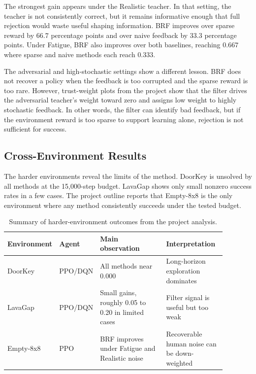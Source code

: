 \documentclass[11pt]{article}
\begin{document}
The strongest gain appears under the Realistic teacher. In that setting, the teacher is not consistently correct, but it remains informative enough that full rejection would waste useful shaping information. BRF improves over sparse reward by $66.7$ percentage points and over naive feedback by $33.3$ percentage points. Under Fatigue, BRF also improves over both baselines, reaching $0.667$ where sparse and naive methods each reach $0.333$.

The adversarial and high-stochastic settings show a different lesson. BRF does not recover a policy when the feedback is too corrupted and the sparse reward is too rare. However, trust-weight plots from the project show that the filter drives the adversarial teacher's weight toward zero and assigns low weight to highly stochastic feedback. In other words, the filter can identify bad feedback, but if the environment reward is too sparse to support learning alone, rejection is not sufficient for success.

\subsection{Cross-Environment Results}

The harder environments reveal the limits of the method. DoorKey is unsolved by all methods at the 15,000-step budget. LavaGap shows only small nonzero success rates in a few cases. The project outline reports that Empty-8x8 is the only environment where any method consistently succeeds under the tested budget.

\begin{table}[h]
\centering
\caption{Summary of harder-environment outcomes from the project analysis.}
\label{tab:hard}
\begin{tabular}{p{0.14\linewidth}p{0.12\linewidth}p{0.34\linewidth}p{0.28\linewidth}}
\toprule
Environment & Agent & Main observation & Interpretation \\
\midrule
DoorKey & PPO/DQN & All methods near 0.000 & Long-horizon exploration dominates \\
LavaGap & PPO/DQN & Small gains, roughly 0.05 to 0.20 in limited cases & Filter signal is useful but too weak \\
Empty-8x8 & PPO & BRF improves under Fatigue and Realistic noise & Recoverable human noise can be down-weighted \\
\bottomrule
\end{tabular}
\end{table}
\end{document}
